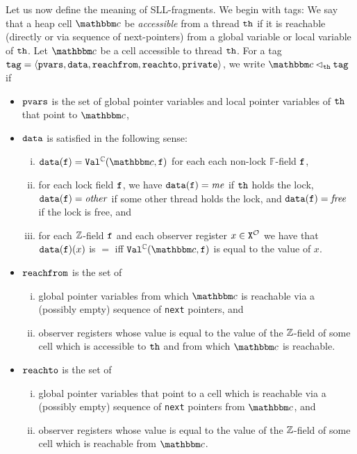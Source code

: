 Let us now define the meaning of SLL-fragments. We begin with tags:
We say that a heap cell $\cell$ be {\em accessible} from a thread ${\tt th}$ if
it is reachable (directly or via sequence of
next-pointers) from a global variable or local variable of ${\tt th}$.
Let $\cell$ be a cell accessible to thread ${\tt th}$. For a tag
$\mathtt{tag} = \left\langle\mathtt{pvars},\mathtt{data},\mathtt{reachfrom},\mathtt{reachto},\mathtt{private}\right\rangle$, we write $\cell \satfrag{\thread} \atag$ if
\begin{itemize}
\item
  $\mathtt{pvars}$ is the set of global pointer variables and
  local pointer variables of ${\tt th}$ that point to $\cell$,
\item
  $\mathtt{data}$ is satisfied in the following sense:
  \begin{enumerate}[(i)]
    \item
      $\vals(\field) = \cellval(\cell,\field)$ for each each non-lock
      $\mathbb{F}$-field $\mathtt{f}$,
  \item
      for each lock field $\mathtt{f}$, we have
      $\mathtt{data}(\mathtt{f}) = \mathit{me}$ if ${\tt th}$ holds the lock,
      $\mathtt{data}(\mathtt{f}) = \mathit{other}$ if some other thread holds the lock, and
      $\mathtt{data}(\mathtt{f}) = \mathit{free}$ if the lock is free,
  and
\item
  for each ${\mathbb Z}$-field $\mathtt{f}$ and each
  observer register $x  \in {\tt X}^{{\mathcal O}}$ we have that
  $\mathtt{data}(\mathtt{f})(x)$ is $=$ iff $\cellval(\cell,\field)$ is equal to the value
  of $x$.
  \end{enumerate}
\item
  $\mathtt{reachfrom}$ is the set of
  \begin{enumerate}[(i)]
  \item global pointer variables
    from which $\cell$ is reachable via a (possibly empty)
    sequence of {\tt next} pointers, and
\item observer registers whose value is equal to the value of the ${\mathbb Z}$-field of some cell which is accessible to ${\tt th}$ and
  from which $\cell$ is reachable.
  \end{enumerate}
\item
  $\mathtt{reachto}$ is the set of
  \begin{enumerate}[(i)]
  \item global pointer variables
    that point to a cell which is reachable via a (possibly empty)
  sequence of {\tt next} pointers from $\cell$, and
  \item observer registers whose value is equal to the value of the ${\mathbb Z}$-field of some cell which is reachable from $\cell$.
  \end{enumerate}
\end{itemize}

